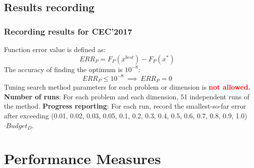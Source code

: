 \documentclass[hyperref={pdfpagelabels=false}]{beamer}
\begin{document}
\subsection{Results recording}
\begin{frame}
\frametitle{Recording results for CEC'2017} 
Function error value is defined as:
\begin{equation*}
  ERR_P = F_P(x^{best})- F_P(x^*)
\end{equation*}
The accuracy of finding the optimum is $10^{-8}$:
\begin{equation*}
 ERR_P \leq 10^{-8} \ \implies \ ERR_P = 0
\end{equation*}
Tuning search method parameters for each problem or dimension is \textcolor{red}{\textbf{not allowed.}}
\newline \newline 
\textbf{Number of runs}: For each problem and each dimension, 51 independent runs of the method. 
\newline
\newline \textbf{Progress reporting}: For each run, record the smallest-so-far error after exceeding (0.01, 0.02, 0.03, 0.05, 0.1, 0.2, 0.3, 0.4, 0.5, 0.6, 0.7, 0.8, 0.9, 1.0)$\cdot Budget_D$.
\end{frame}


\section{Performance Measures}
\end{document}
